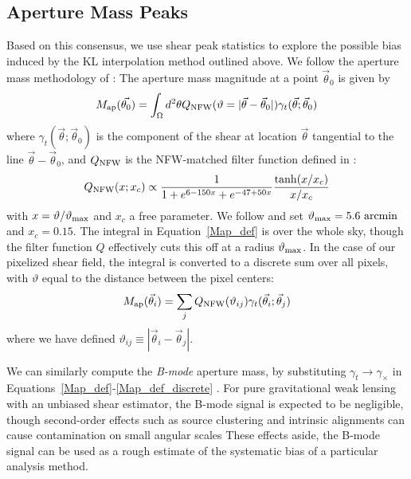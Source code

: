 \subsection{Aperture Mass Peaks}
\label{Aperture_Mass}
Based on this consensus, we use shear peak statistics to explore
the possible bias induced by the KL interpolation method outlined above.  
We follow the aperture mass methodology of \citet{Dietrich10}:
The aperture mass magnitude at a point $\vec\theta_0$ is given by
\begin{equation}
  \label{Map_def}
  M_{\rm ap}(\vec{\theta_0})
  = \int_\Omega d^2\theta Q_{\rm NFW}(\vartheta=|\vec\theta-\vec\theta_0|) 
  \gamma_t(\vec\theta;\vec\theta_0)
\end{equation}
where $\gamma_t(\vec\theta;\vec\theta_0)$ is the component of the shear at 
location $\vec\theta$ tangential to the line $\vec\theta-\vec\theta_0$, 
and $Q_{\rm NFW}$ is the 
NFW-matched filter function defined in \citet{Schirmer07}:
\begin{equation}
  Q_{\rm NFW}(x;x_c) \propto \frac{1}{1+e^{6-150x}+e^{-47+50x}}
  \frac{\tanh(x/x_c)}{x/x_c}
\end{equation}
with $x = \vartheta/\vartheta_{\rm max}$ and $x_c$ a free parameter. We follow
\citet{Dietrich10} and set $\vartheta_{\rm max}=5.6\ \mathrm{arcmin}$ and
$x_c=0.15$.  The integral in Equation~\ref{Map_def} is over the whole sky, 
though the filter function $Q$ effectively cuts this off at a radius
$\vartheta_{\rm max}$.  
In the case of our pixelized shear field, the integral is converted to 
a discrete sum over all pixels, with
$\vartheta$ equal to the distance between the pixel centers:
\begin{equation}
  \label{Map_def_discrete}
  M_{\rm ap}(\vec{\theta}_i) 
  = \sum_j Q_{\rm NFW}(\vartheta_{ij}) 
  \gamma_t(\vec{\theta}_i;\vec{\theta}_j) 
\end{equation}
where we have defined $\vartheta_{ij} \equiv |\vec\theta_i-\vec\theta_j|$.

We can similarly compute the \textit{B-mode} aperture mass, by substituting
$\gamma_t \to \gamma_\times$ in Equations~\ref{Map_def}-\ref{Map_def_discrete}
\citep{Crittenden02}.  For pure gravitational
weak lensing with an unbiased shear estimator, the B-mode signal is 
expected to be negligible, though second-order effects such as 
source clustering and intrinsic 
alignments can cause contamination on small angular scales 
\citep{Crittenden02,Schneider02b}
These effects aside, the B-mode signal can be used as a rough estimate of the
systematic bias of a particular analysis method.

